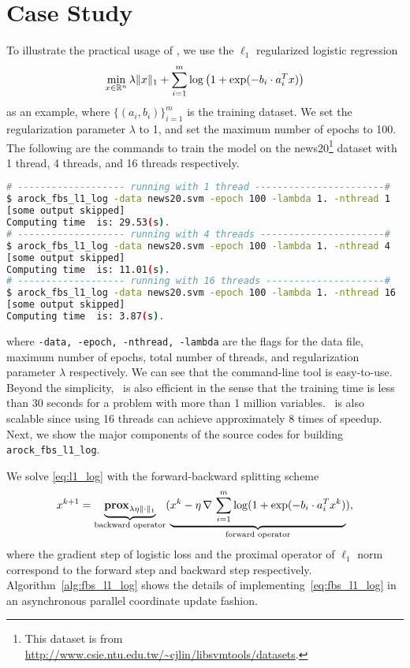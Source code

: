 \section{Case Study}\label{sec:quick_start}
To illustrate the practical usage of \pkg, we use the $\ell_1$ regularized logistic regression
\begin{equation}\label{eq:l1_log}
\min_{x \in \mathbb{R}^n} \lambda \|x\|_1 + \sum_{i = 1}^m \log\left(1 + \exp(-b_i \cdot a_i^T x)\right)
\end{equation}
as an example, where $\{(a_i, b_i)\}_{i = 1}^m$ is the training dataset. We set the regularization parameter
$\lambda$ to 1, and set the maximum number of epochs to 100. The following are the commands to train the model
on the news20\footnote{ This dataset is from \url{http://www.csie.ntu.edu.tw/~cjlin/libsvmtools/datasets}.}
dataset with 1 thread, 4 threads, and 16 threads respectively.
\begin{lstlisting}[language=bash]
# ------------------- running with 1 thread -----------------------#
$ arock_fbs_l1_log -data news20.svm -epoch 100 -lambda 1. -nthread 1 
[some output skipped]
Computing time  is: 29.53(s).
# ------------------- running with 4 threads ----------------------#
$ arock_fbs_l1_log -data news20.svm -epoch 100 -lambda 1. -nthread 4 
[some output skipped]
Computing time  is: 11.01(s).
# ------------------- running with 16 threads ---------------------#
$ arock_fbs_l1_log -data news20.svm -epoch 100 -lambda 1. -nthread 16
[some output skipped]
Computing time  is: 3.87(s).
\end{lstlisting}
where \texttt{-data, -epoch, -nthread, -lambda} are the flags for the data file, maximum number of epochs,
total number of threads, and regularization parameter $\lambda$ respectively. We can see that the command-line
tool is easy-to-use. Beyond the simplicity, \pkg~is also efficient in the sense that the training time is
less than 30 seconds for a problem with more than 1 million variables. \pkg~is also scalable since
using 16 threads can achieve approximately 8 times of speedup. Next, we show the major components of the source
codes for building \texttt{arock\_fbs\_l1\_log}.

We solve \eqref{eq:l1_log} with the forward-backward splitting scheme
\begin{equation}\label{eq:fbs_l1_log}
  x^{k+1} = \underbrace{\mathbf{prox}_{\lambda \eta \|\cdot\|_1}}_{\text{backward operator}}
  (\underbrace{x^k - \eta \, \nabla \,\sum_{i = 1}^m \log (1 + \exp(-b_i \cdot a_i^T x^k)}_{\text{forward operator}}),
\end{equation}  
where the gradient step of logistic loss and the proximal operator of $\ell_1$ norm correspond to the
forward step and backward step respectively. Algorithm~\ref{alg:fbs_l1_log} shows the details of
implementing~\eqref{eq:fbs_l1_log} in an asynchronous parallel coordinate update fashion.


